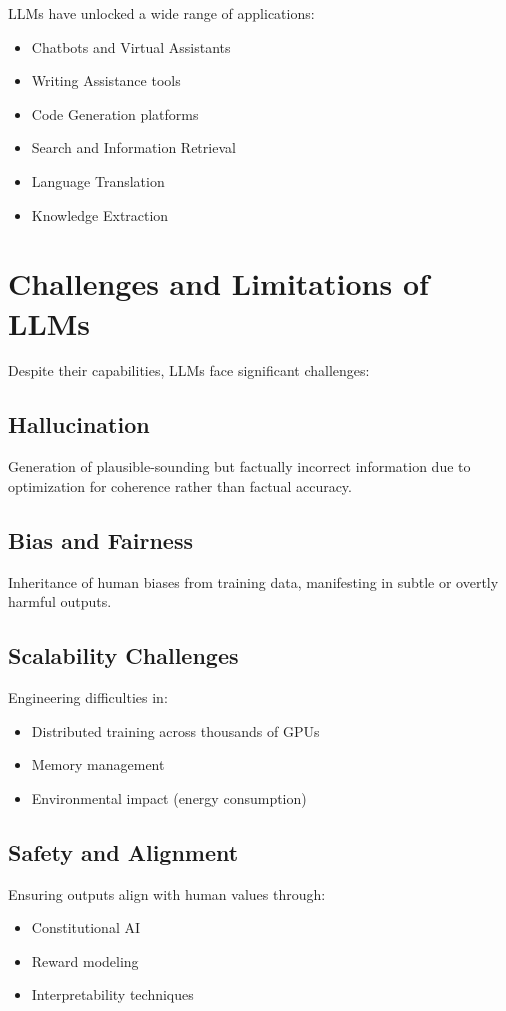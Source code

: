 \documentclass[openany]{book}
\begin{document}
LLMs have unlocked a wide range of applications:

\begin{itemize}
    \item Chatbots and Virtual Assistants
    \item Writing Assistance tools
    \item Code Generation platforms
    \item Search and Information Retrieval
    \item Language Translation
    \item Knowledge Extraction
\end{itemize}

\section{Challenges and Limitations of LLMs}

Despite their capabilities, LLMs face significant challenges:

\subsection{Hallucination}
Generation of plausible-sounding but factually incorrect information due to 
optimization for coherence rather than factual accuracy.

\subsection{Bias and Fairness}
Inheritance of human biases from training data, manifesting in subtle or 
overtly harmful outputs.

\subsection{Scalability Challenges}
Engineering difficulties in:
\begin{itemize}
    \item Distributed training across thousands of GPUs
    \item Memory management
    \item Environmental impact (energy consumption)
\end{itemize}

\subsection{Safety and Alignment}
Ensuring outputs align with human values through:
\begin{itemize}
    \item Constitutional AI
    \item Reward modeling
    \item Interpretability techniques
\end{itemize}
\end{document}
